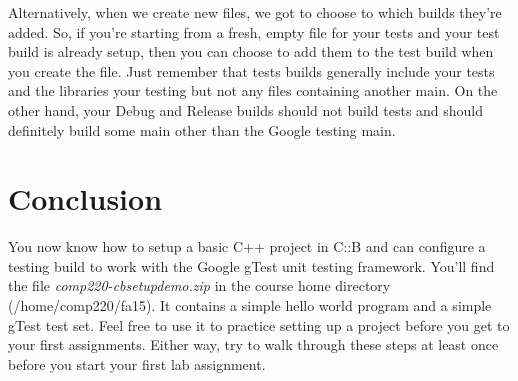 \documentclass[10pt]{article}
\begin{document}
Alternatively, when we create new files, we got to choose to which builds they're added. So, if you're starting from a fresh, empty file for your tests and your test build is already setup, then you can choose to add them to the test build when you create the file. Just remember that tests builds generally include your tests and the libraries your testing but not any files containing another main. On the other hand, your Debug and Release builds should not build tests and should definitely build some main other than the Google testing main.


\section{Conclusion}

You now know how to setup a basic C++ project in C::B and can configure a testing build to work with the Google gTest unit testing framework. You'll find the file \textit{comp220-cbsetupdemo.zip} in the course home directory (/home/comp220/fa15).  It contains a simple hello world program and a simple gTest test set. Feel free to use it to practice setting up a project before you get to your first assignments. Either way, try to walk through these steps at least once before you start your first lab assignment.
\end{document}
